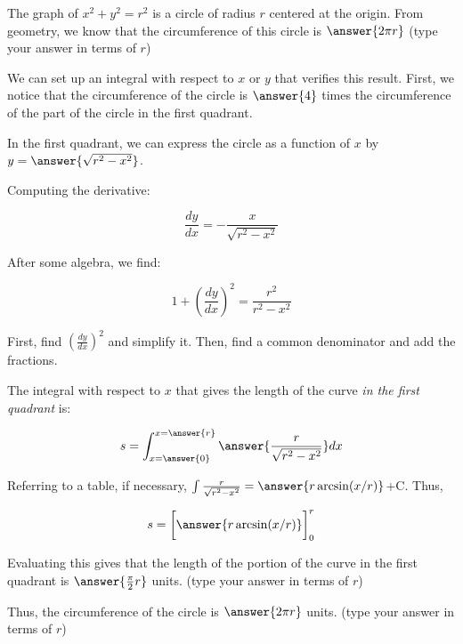 \documentclass{ximera}
\author{Jim Talamo}
\begin{document}
\begin{exercise}

The graph of $x^2+y^2=r^2$ is a circle of radius $r$ centered at the origin.  From geometry, we know that the circumference of this circle is $\answer{2 \pi r}$ (type your answer in terms of $r$)

\begin{exercise}
We can set up an integral with respect to $x$ or $y$ that verifies this result.  First, we notice that the circumference of the circle is $\answer{4}$ times the circumference of the part of the circle in the first quadrant.

In the first quadrant, we can express the circle as a function of $x$ by $y=\answer{\sqrt{r^2-x^2}}$.

\begin{exercise}
Computing the derivative:

\[
\frac{dy}{dx} = -\frac{x}{\sqrt{r^2-x^2}}
\]

\begin{exercise}

After some algebra, we find:

\[
1+ \left(\frac{dy}{dx} \right)^2 = \frac{r^2}{r^2-x^2}
\]

\begin{hint}
First, find $\left(\frac{dy}{dx} \right)^2$ and simplify it.  Then, find a common denominator and add the fractions.
\end{hint}

\begin{exercise}

The integral with respect to $x$ that gives the length of the curve \emph{in the first quadrant} is:

\[
s= \int_{x=\answer{0}}^{x=\answer{r}} \answer{\frac{r}{\sqrt{r^2-x^2}}} dx
\]

\begin{exercise}
Referring to a table, if necessary, $\int \frac{r}{\sqrt{r^2-x^2}} = \answer{r \arcsin(x/r)}$+C.  Thus,

\[
s= \bigg[\answer{r \arcsin(x/r)}\bigg]_0^r
\]

Evaluating this gives that the length of the portion of the curve in the first quadrant is $\answer{\frac{\pi}{2}r}$ units. (type your answer in terms of $r$)

\begin{exercise}
Thus, the circumference of the circle is $\answer{2 \pi r}$ units. (type your answer in terms of $r$)

\end{exercise}

\end{exercise}
\end{exercise}
\end{exercise}
\end{exercise}
\end{exercise}
\end{exercise}
\end{document}
